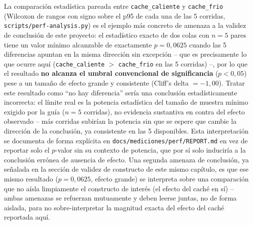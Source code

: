 La comparación estadística pareada entre \texttt{cache\_caliente} y
\texttt{cache\_frio} (Wilcoxon de rangos con signo sobre el p95 de cada
una de las 5 corridas, \texttt{scripts/perf-analysis.py}) es el ejemplo
más concreto de amenaza a la validez de conclusión de este proyecto: el
estadístico exacto de dos colas con $n=5$ pares tiene un valor mínimo
alcanzable de exactamente $p=0{,}0625$ cuando las 5 diferencias apuntan
en la misma dirección sin excepción -- que es precisamente lo que
ocurre aquí (\texttt{cache\_caliente} $>$ \texttt{cache\_frio} en las 5
corridas) --, por lo que el resultado \textbf{no alcanza el umbral
convencional de significancia} ($p<0{,}05$) pese a un tamaño de efecto
grande y consistente (Cliff's delta $=-1{,}00$). Tratar este resultado
como ``no hay diferencia'' sería una conclusión estadísticamente
incorrecta: el límite real es la potencia estadística del tamaño de
muestra mínimo exigido por la guía ($n=5$ corridas), no evidencia
sustantiva en contra del efecto observado -- más corridas subirían la
potencia sin que se espere que cambie la dirección de la conclusión, ya
consistente en las 5 disponibles. Esta interpretación se documenta de
forma explícita en \texttt{docs/mediciones/perf/REPORT.md} en vez de
reportar solo el $p$-valor sin su contexto de potencia, que por sí solo
induciría a la conclusión errónea de ausencia de efecto. Una segunda
amenaza de conclusión, ya señalada en la sección de validez de
constructo de este mismo capítulo, es que ese mismo resultado
($p=0{,}0625$, efecto grande) se interpreta sobre una comparación que no
aísla limpiamente el constructo de interés (el efecto del caché en sí) --
ambas amenazas se refuerzan mutuamente y deben leerse juntas, no de
forma aislada, para no sobre-interpretar la magnitud exacta del efecto
del caché reportada aquí.
